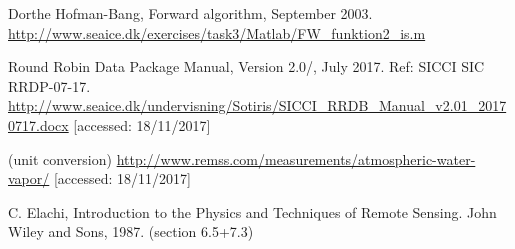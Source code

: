 \documentclass[11pt, a4paper]{article}
\begin{document}
\clearpage
\begin{thebibliography}{99}
	 Dorthe Hofman-Bang, Forward algorithm, September 2003. \newline \url{http://www.seaice.dk/exercises/task3/Matlab/FW_funktion2_is.m} \newline [accessed: 18/11/2017]
	
	
	 Round Robin Data Package Manual, Version 2.0/, July 2017. Ref: SICCI SIC RRDP-07-17. \newline
	\url{http://www.seaice.dk/undervisning/Sotiris/SICCI_RRDB_Manual_v2.01_20170717.docx} [accessed: 18/11/2017]
	
	 (unit conversion) \url{http://www.remss.com/measurements/atmospheric-water-vapor/} [accessed: 18/11/2017]
	
	  C. Elachi, Introduction to the Physics and Techniques of Remote Sensing. John Wiley and Sons, 1987. (section 6.5+7.3)
	
\end{thebibliography}
\end{document}

